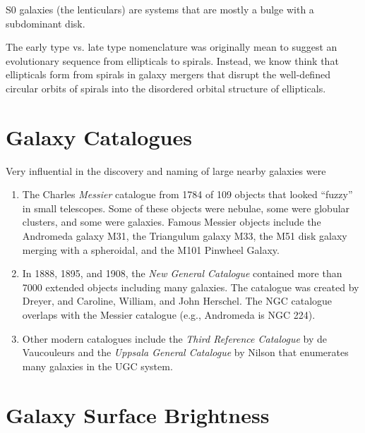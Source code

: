 \documentclass[]{article}
\begin{document}
S0 galaxies (the lenticulars) are systems that are mostly a
bulge with a subdominant disk.

The early type vs. late type nomenclature was originally
mean to suggest an evolutionary sequence from ellipticals to
spirals. Instead, we know think that ellipticals form from
spirals in galaxy mergers that disrupt the well-defined 
circular orbits of spirals into the disordered orbital
structure of ellipticals.

\section{Galaxy Catalogues}

Very influential in the discovery and naming of large
nearby galaxies were
\begin{enumerate}

\item The Charles {\it Messier} catalogue from 1784 of 109 
objects that looked ``fuzzy'' in small telescopes. Some
of these objects were nebulae, some were globular clusters,
and some were galaxies. Famous Messier objects include the
Andromeda galaxy M31, the Triangulum galaxy M33, the M51
disk galaxy merging with a spheroidal, and the M101 Pinwheel
Galaxy.

\item In 1888, 1895, and 1908, the {\it New General Catalogue}
contained more than 7000 extended objects including many
galaxies. The catalogue was created by Dreyer, and Caroline,
William, and John Herschel.  The NGC catalogue overlaps with
the Messier catalogue (e.g., Andromeda is NGC 224).

\item Other modern catalogues include the {\it Third Reference
Catalogue} by de Vaucouleurs and the {\it Uppsala General
Catalogue} by Nilson that enumerates many galaxies in the UGC
system.
\end{enumerate}

\section{Galaxy Surface Brightness}
\end{document}
